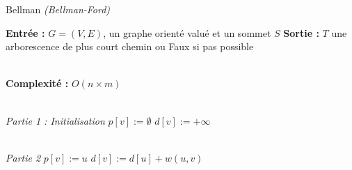 \documentclass{article}      %
\begin{document}
\begin{algorithm} \caption{Bellman \textit{(Bellman-Ford)}}
\begin{algorithmic}

\State \textbf{Entrée :} $G = (V, E)$, un graphe orienté valué et un sommet $S$
\State \textbf{Sortie :} $T$ une arborescence de plus court chemin ou Faux si pas possible

\\ \State \textbf{Complexité :} $O(n\times m)$

\\ \State \textit{Partie 1 : Initialisation}
    \State $p[v] := \emptyset$
    \State $d[v] := +\infty$
\EndFor


\\ \State \textit{Partie 2}
            \State $p[v] := u$
            \State $d[v] := d[u] + w(u, v)$
        \EndIf
    \EndFor
\EndFor
\end{algorithmic}
\end{algorithm}
\end{document}
